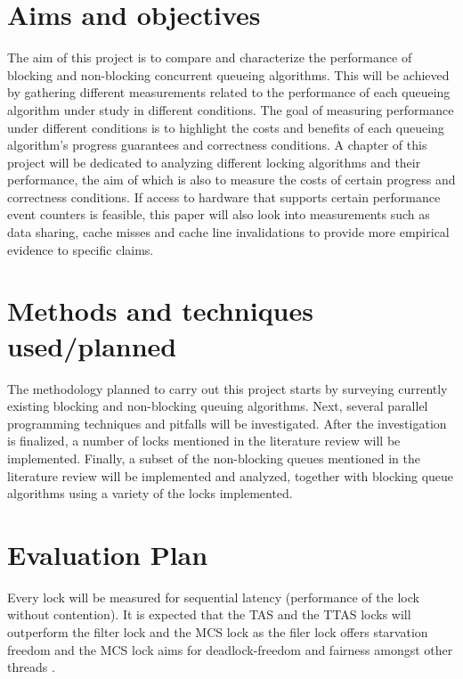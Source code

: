 \documentclass[a4paper, 12pt, titlepage]{article}
\begin{document}
\begin{singlespace}
\section{Aims and objectives}
The aim of this project is to compare and characterize the performance of blocking \cite{anderson1990performance, herlihy2020art,graunke1990synchronization} and non-blocking \cite{herlihy2020art,valois1995lock} concurrent queueing algorithms. This will be achieved by gathering different measurements related to the performance of each queueing algorithm under study in different conditions. The goal of measuring performance under different conditions is to highlight the costs and benefits of each queueing algorithm's progress guarantees and correctness conditions. A chapter of this project will be dedicated to analyzing different locking algorithms and their performance, the aim of which is also to measure the costs of certain progress and correctness conditions. If access to hardware that supports certain performance event counters is feasible, this paper will also look into measurements such as data sharing, cache misses and cache line invalidations \cite{intelmanual,intelmanualoptimization,sahelices2009methodology} to provide more empirical evidence to specific claims.

\section{Methods and techniques used/planned}
The methodology planned to carry out this project starts by surveying currently existing blocking and non-blocking queuing algorithms. Next, several parallel programming techniques and pitfalls will be investigated. After the investigation is finalized, a number of locks mentioned in the literature review will be implemented. Finally, a subset of the non-blocking queues mentioned in the literature review will be implemented and analyzed, together with blocking queue algorithms using a variety of the locks implemented.

\section{Evaluation Plan}
Every lock will be measured for sequential latency (performance of the lock without contention). It is expected that the TAS and the TTAS locks will outperform the filter lock and the MCS lock as the filer lock offers starvation freedom \cite{herlihy2020art} and the MCS lock aims for deadlock-freedom and fairness amongst other threads \cite{mellor1991algorithms}.


\end{singlespace}
\end{document}
